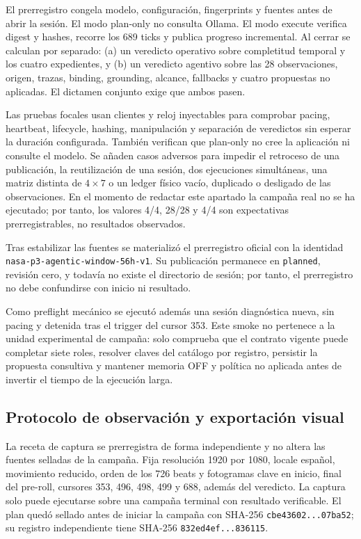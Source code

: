 El prerregistro congela modelo, configuración, fingerprints y fuentes antes de
abrir la sesión. El modo plan-only no consulta Ollama. El modo execute verifica
digest y hashes, recorre los 689 ticks y publica progreso incremental. Al cerrar
se calculan por separado: (a) un veredicto operativo sobre completitud temporal
y los cuatro expedientes, y (b) un veredicto agentivo sobre las 28 observaciones,
origen, trazas, binding, grounding, alcance, fallbacks y cuatro propuestas no
aplicadas. El dictamen conjunto exige que ambos pasen.

Las pruebas focales usan clientes y reloj inyectables para comprobar pacing,
heartbeat, lifecycle, hashing, manipulación y separación de veredictos sin
esperar la duración configurada. También verifican que plan-only no cree la
aplicación ni consulte el modelo. Se añaden casos adversos para impedir el
retroceso de una publicación, la reutilización de una sesión, dos ejecuciones
simultáneas, una matriz distinta de $4\times7$ o un ledger físico vacío,
duplicado o desligado de las observaciones. En el momento de redactar este apartado la
campaña real no se ha ejecutado; por tanto, los valores 4/4, 28/28 y 4/4 son
expectativas prerregistrables, no resultados observados.

Tras estabilizar las fuentes se materializó el prerregistro oficial con la
identidad \texttt{nasa-p3-agentic-window-56h-v1}. Su publicación permanece en
\texttt{planned}, revisión cero, y todavía no existe el directorio de sesión;
por tanto, el prerregistro no debe confundirse con inicio ni resultado.

Como preflight mecánico se ejecutó además una sesión diagnóstica nueva, sin
pacing y detenida tras el trigger del cursor 353. Este smoke no pertenece a la
unidad experimental de campaña: solo comprueba que el contrato vigente puede
completar siete roles, resolver claves del catálogo por registro, persistir la
propuesta consultiva y mantener memoria OFF y política no aplicada antes de
invertir el tiempo de la ejecución larga.

\subsection{Protocolo de observación y exportación visual}

La receta de captura se prerregistra de forma independiente y no altera las
fuentes selladas de la campaña. Fija resolución 1920 por 1080, locale español,
movimiento reducido, orden de los 726 beats y fotogramas clave en inicio, final
del pre-roll, cursores 353, 496, 498, 499 y 688, además del veredicto. La captura
solo puede ejecutarse sobre una campaña terminal con resultado verificable.
El plan quedó sellado antes de iniciar la campaña con SHA-256
\texttt{cbe43602...07ba52}; su registro independiente tiene SHA-256
\texttt{832ed4ef...836115}.


